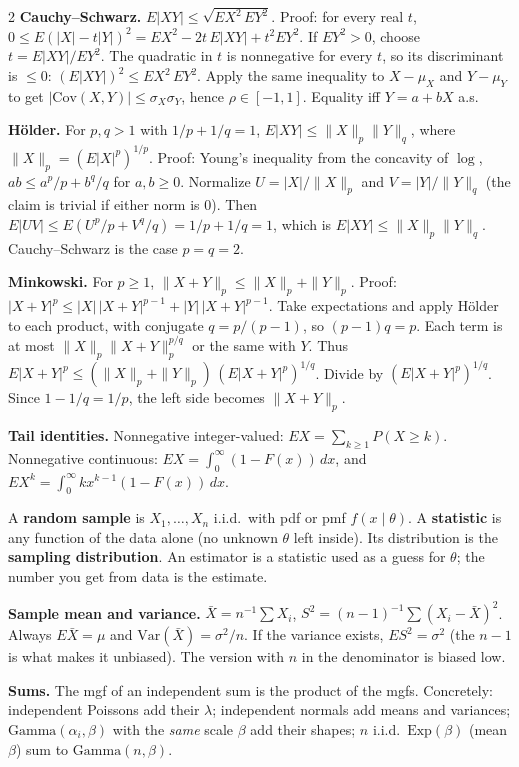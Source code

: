 \documentclass{article}
\newcommand{\sect}[1]{\par\vspace{1.05pt}{\fontsize{8}{9}\selectfont\textbf{#1}}\par\vspace{0.15pt}}
\newcommand{\kw}[1]{\textbf{#1}}
\begin{document}
\begin{multicols}{2}
\kw{Cauchy--Schwarz.} $E|XY|\le\sqrt{EX^2\,EY^2}$. Proof: for every real $t$, $0\le E(|X|-t|Y|)^2=EX^2-2t\,E|XY|+t^2 EY^2$. If $EY^2>0$, choose $t=E|XY|/EY^2$. The quadratic in $t$ is nonnegative for every $t$, so its discriminant is $\le 0$: $(E|XY|)^2\le EX^2\,EY^2$. Apply the same inequality to $X-\mu_X$ and $Y-\mu_Y$ to get $|\mathrm{Cov}(X,Y)|\le\sigma_X\sigma_Y$, hence $\rho\in[-1,1]$. Equality iff $Y=a+bX$ a.s.

\kw{H\"older.} For $p,q>1$ with $1/p+1/q=1$, $E|XY|\le\|X\|_p\|Y\|_q$, where $\|X\|_p=(E|X|^p)^{1/p}$. Proof: Young's inequality from the concavity of $\log$, $ab\le a^p/p+b^q/q$ for $a,b\ge 0$. Normalize $U=|X|/\|X\|_p$ and $V=|Y|/\|Y\|_q$ (the claim is trivial if either norm is $0$). Then $E|UV|\le E(U^p/p+V^q/q)=1/p+1/q=1$, which is $E|XY|\le\|X\|_p\|Y\|_q$. Cauchy--Schwarz is the case $p=q=2$.

\kw{Minkowski.} For $p\ge 1$, $\|X+Y\|_p\le\|X\|_p+\|Y\|_p$. Proof: $|X+Y|^p\le|X|\,|X+Y|^{p-1}+|Y|\,|X+Y|^{p-1}$. Take expectations and apply H\"older to each product, with conjugate $q=p/(p-1)$, so $(p-1)q=p$. Each term is at most $\|X\|_p\|X+Y\|_p^{p/q}$ or the same with $Y$. Thus $E|X+Y|^p\le(\|X\|_p+\|Y\|_p)\,(E|X+Y|^p)^{1/q}$. Divide by $(E|X+Y|^p)^{1/q}$. Since $1-1/q=1/p$, the left side becomes $\|X+Y\|_p$.

\kw{Tail identities.} Nonnegative integer-valued: $EX=\sum_{k\ge 1}P(X\ge k)$. Nonnegative continuous: $EX=\int_0^\infty(1-F(x))\,dx$, and $EX^k=\int_0^\infty kx^{k-1}(1-F(x))\,dx$.

\sect{2. A random sample (5.1--5.4)}
A \kw{random sample} is $X_1,\ldots,X_n$ i.i.d.\ with pdf or pmf $f(x\mid\theta)$. A \kw{statistic} is any function of the data alone (no unknown $\theta$ left inside). Its distribution is the \kw{sampling distribution}. An estimator is a statistic used as a guess for $\theta$; the number you get from data is the estimate.

\kw{Sample mean and variance.} $\bar X=n^{-1}\sum X_i$, $S^2=(n-1)^{-1}\sum(X_i-\bar X)^2$. Always $E\bar X=\mu$ and $\mathrm{Var}(\bar X)=\sigma^2/n$. If the variance exists, $ES^2=\sigma^2$ (the $n-1$ is what makes it unbiased). The version with $n$ in the denominator is biased low.

\kw{Sums.} The mgf of an independent sum is the product of the mgfs. Concretely: independent Poissons add their $\lambda$; independent normals add means and variances; $\mathrm{Gamma}(\alpha_i,\beta)$ with the \emph{same} scale $\beta$ add their shapes; $n$ i.i.d.\ $\mathrm{Exp}(\beta)$ (mean $\beta$) sum to $\mathrm{Gamma}(n,\beta)$.


\end{multicols}
\end{document}
